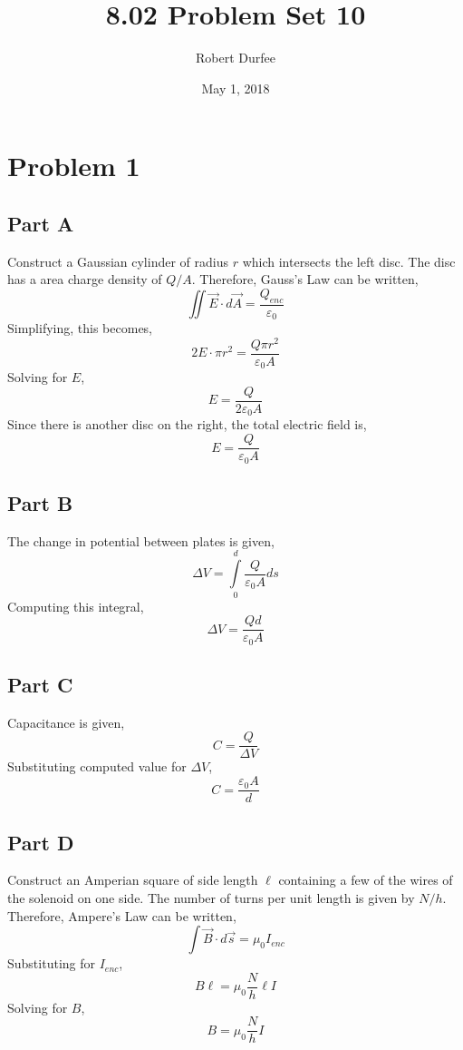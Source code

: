 \documentclass{article}
\title{8.02 Problem Set 10}
\author{Robert Durfee}
\date{May 1, 2018}
\begin{document}
\maketitle

\section*{Problem 1}

\subsection*{Part A}

Construct a Gaussian cylinder of radius $r$ which intersects the left disc. The
disc has a area charge density of $Q/A$. Therefore, Gauss's Law can be written,
$$ \iint \vec{E} \cdot d\vec{A} = \frac{Q_{enc}}{\varepsilon_0} $$
Simplifying, this becomes,
$$ 2 E \cdot \pi r^2 = \frac{Q \pi r^2}{\varepsilon_0 A} $$
Solving for $E$,
$$ E = \frac{Q}{2 \varepsilon_0 A} $$
Since there is another disc on the right, the total electric field is,
$$ E = \frac{Q}{\varepsilon_0 A} $$

\subsection*{Part B}

The change in potential between plates is given,
$$ \Delta V = \int\limits_0^d \frac{Q}{\varepsilon_0 A} ds $$
Computing this integral,
$$ \Delta V = \frac{Q d}{\varepsilon_0 A} $$

\subsection*{Part C}

Capacitance is given,
$$ C = \frac{Q}{\Delta V} $$
Substituting computed value for $\Delta V$,
$$ C = \frac{\varepsilon_0 A}{d} $$

\subsection*{Part D}

Construct an Amperian square of side length $\ell$ containing a few of the wires
of the solenoid on one side. The number of turns per unit length is given by
$N/h$. Therefore, Ampere's Law can be written,
$$ \int \vec{B} \cdot d\vec{s} = \mu_0 I_{enc} $$
Substituting for $I_{enc}$,
$$ B \ell = \mu_0 \frac{N}{h} \ell I $$
Solving for $B$,
$$ B = \mu_0 \frac{N}{h}I $$
\end{document}
